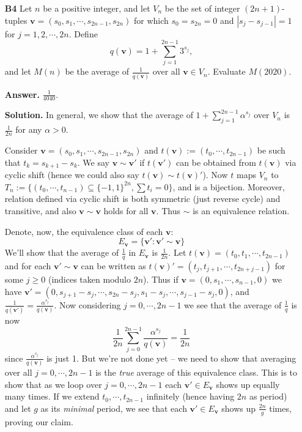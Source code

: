 \documentclass[11pt,a4paper]{article}
\newcommand{\<}{\langle}
\renewcommand{\>}{\rangle}
\begin{document}
\begin{enumerate}
	\item [\textbf{B4}] 
	Let $n$ be a positive integer, and let $V_n$ be the set of integer $(2n+1)$-tuples $\mathbf{v}=(s_0,s_1,\cdots,s_{2n-1},s_{2n})$ for which $s_0=s_{2n}=0$ and $|s_j-s_{j-1}|=1$ for $j=1,2,\cdots,2n$. Define
	\[
	q(\mathbf{v})=1+\sum_{j=1}^{2n-1}3^{s_j},
	\]and let $M(n)$ be the average of $\frac{1}{q(\mathbf{v})}$ over all $\mathbf{v}\in V_n$. Evaluate $M(2020)$.
	
	\textbf{Answer.} $\frac{1}{4040}$. 
	
	\textbf{Solution.} In general, we show that the average of $1+\sum_{j=1}^{2n-1}\alpha^{s_j}$ over $V_n$ is $\frac{1}{2n}$ for any $\alpha > 0$. 
	
	Consider $\mathbf{v}=(s_0,s_1,\cdots,s_{2n-1},s_{2n})$ and 
	$t(\mathbf{v}) := (t_0, \cdots, t_{2n-1})$ be such that $t_k = s_{k+1}-s_k$. 
	We say $\mathbf{v}\sim\mathbf{v'}$ if $t(\mathbf{v}')$ can be obtained from $t(\mathbf{v})$ via cyclic shift (hence we could also say $t(\mathbf{v})\sim t(\mathbf{v})'$). 
	Now $t$ maps $V_n$ to $T_n:=\{(t_0, \cdots, t_{n-1})\subseteq \{-1, 1\}^{2n}, \sum t_i=0\}$, 
	and is a bijection. 
	Moreover, relation defined via cyclic shift is both symmetric (just reverse cycle) and transitive, and also $\mathbf{v}\sim\mathbf{v}$ holds for all $\mathbf{v}$. 
	Thus $\sim$ is an equivalence relation. 
	
	Denote, now, the equivalence class of each $\mathbf{v}$: 
	\[
	E_{\mathbf{v}} = \{\mathbf{v}': \mathbf{v'}\sim \mathbf{v}\}
	\]
	We'll show that the average of $\frac{1}{q}$ in $E_{\mathbf{v}}$ is $\frac{1}{2n}$. 
	Let $t(\mathbf{v})=(t_0,t_1,\cdots,t_{2n-1})$ and for each $\mathbf{v}'\sim\mathbf{v}$ can be written as 
	$t(\mathbf{v})'=(t_j,t_{j+1},\cdots,t_{2n+j-1})$ for some $j\ge 0$ (indices taken modulo $2n$). 
	Thus if $\mathbf{v}=(0, s_1, \cdots, s_{n-1}, 0)$ we have 
	$\mathbf{v}'=(0, s_{j+1}-s_j, \cdots, s_{2n}-s_j, s_1-s_j, \cdots, s_{j-1}-s_j, 0)$, 
	and $\frac{1}{q(\mathbf{v}')}=\frac{\alpha^{s_j}}{q(\mathbf{v})}$. 
	Now considering $j=0, \cdots, 2n-1$ we see that the average of $\frac{1}{q}$ is now 
	\[
	\frac{1}{2n}\sum_{j=0}^{2n-1}\frac{\alpha^{s_j}}{q(\mathbf{v})} = \frac{1}{2n}
	\]
	since $\frac{\alpha^{s_j}}{q(\mathbf{v})}$ is just 1. 
	But we're not done yet -- we need to show that averaging over all $j=0, \cdots, 2n-1$ is the \emph{true} average of this equivalence class. 
	This is to show that as we loop over $j=0, \cdots, 2n-1$ each $\mathbf{v}'\in E_{\mathbf{v}}$ shows up equally many times. 
	If we extend $t_0, \cdots, t_{2n-1}$ infinitely (hence having $2n$ as period) and let $g$ as its \emph{minimal} period, we see that each $\mathbf{v}'\in E_{\mathbf{v}}$ shows up $\frac{2n}{g}$ times, 
	proving our claim. 
	
\end{enumerate}
\end{document}
